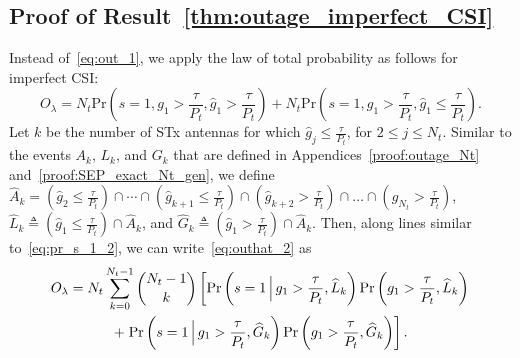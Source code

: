 \documentclass[12pt,draftcls,peerreview,onecolumn]{IEEEtran}
\newcommand{\brac}[1]{\left({#1}\right)}
\newcommand{\define}{\triangleq}
\newcommand{\prob}[1]{\text{Pr}\brac{#1}}
\newcommand{\Given}{\Big\arrowvert}
\newcommand{\nck}[2]{\binom{#1}{#2}}
\newcommand{\setA}{A}
\newcommand{\setAk}{\setA_{k}}
\newcommand{\setAkhat}{\widehat{\setA}_k}
\newcommand{\setG}{G}
\newcommand{\setL}{L}
\newcommand{\setGk}{\setG_k}
\newcommand{\setLk}{\setL_k}
\newcommand{\setGkhat}{\widehat{\setG}_k}
\newcommand{\setLkhat}{\widehat{\setL}_k}
\newcommand{\lam}{\lambda}
\newcommand{\Nt}{{N_t}}
\newcommand{\Pt}{{P_t}}
\newcommand{\puch}{g}
\newcommand{\gk}[1]{{\puch_{#1}}}
\newcommand{\itau}{\tau}
\newcommand{\out}{O}
\newcommand{\taubypt}{\frac{\itau}{\Pt}}
\newcommand{\gkgrtaubypt}[1]{{\gk{#1}}>\taubypt}
\newcommand{\gkhatgrtaubypt}[1]{{\gkhat{#1}}>\taubypt}
\newcommand{\gkhatlttaubypt}[1]{{\gkhat{#1}}\leq\taubypt}
\newcommand{\outlam}{\out_{\lam}}
\newcommand{\ghat}{\hat{\puch}}
\newcommand{\gkhat}[1]{\ghat_{#1}}
\begin{document}
\subsection{Proof of Result~\ref{thm:outage_imperfect_CSI}}
\label{proof:outage_imperfect_CSI}
Instead of~\eqref{eq:out_1}, we apply the law of total probability as follows for imperfect CSI:
\begin{equation}
\outlam=\Nt\text{Pr}\brac{s=1,\gk{1}>\taubypt,\gkhat{1}>\taubypt} + \Nt\text{Pr}\brac{s=1,\gk{1}>\taubypt,\gkhat{1}\leq\taubypt}.
\label{eq:outhat_2}
\end{equation}
Let $k$ be the number of STx antennas for which $\gkhatlttaubypt{j}$, for $2\leq j \leq\Nt$. Similar to the events $\setAk$, $\setLk$,  and  $\setGk$ that are defined in Appendices~\ref{proof:outage_Nt} and~\ref{proof:SEP_exact_Nt_gen}, we define $\setAkhat=\left(  \gkhatlttaubypt{2}\right)\cap\cdots\cap\left(\gkhatlttaubypt{k+1}\right)\cap\left(\gkhatgrtaubypt{k+2}\right)\cap\dots\cap\left(\gkhatgrtaubypt{\Nt}\right)$, $\setLkhat\define\left(\gkhatlttaubypt{1}\right)\cap\setAkhat $, and $\setGkhat\define\left(\gkhatgrtaubypt{1}\right)\cap\setAkhat $. Then, along lines similar to~\eqref{eq:pr_s_1_2}, we can write~\eqref{eq:outhat_2}  as
%
\begin{multline}
\outlam =\Nt\sum_{k=0}^{\Nt-1}\nck{\Nt-1}{k}\left[ \prob{s = 1 \Given \gkgrtaubypt{1},\setLkhat} \prob{\gkgrtaubypt{1},\setLkhat} \right. \\  +\left.
\prob{s = 1 \Given\gkgrtaubypt{1}, \setGkhat } \prob{\gkgrtaubypt{1},\setGkhat}\right]. 
\label{eq:pr_s_1_2_imp}
\end{multline}
%
\end{document}
